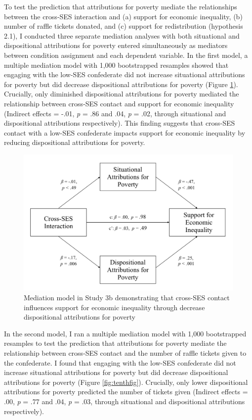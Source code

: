 \documentclass{sfuthesis}
\begin{document}
To test the prediction that attributions for poverty mediate the relationships between the cross-SES interaction and (a) support for economic inequality, (b) number of raffle tickets donated, and (c) support for redistribution (hypothesis 2.1), I conducted three separate mediation analyses with both situational and dispositional attributions for poverty entered simultaneously as mediators between condition assignment and each dependent variable. In the first model, a multiple mediation model with 1,000 bootstrapped resamples showed that engaging with the low-SES confederate did not increase situational attributions for poverty but did decrease dispositional attributions for poverty (Figure \ref{fig:ninthfig}). Crucially, only diminished dispositional attributions for poverty mediated the relationship between cross-SES contact and support for economic inequality (Indirect effects = -.01, \textit{p} = .86 and .04, \textit{p} = .02, through situational and dispositional attributions respectively). This finding suggests that cross-SES contact with a low-SES confederate impacts support for economic inequality by reducing dispositional attributions for poverty. 

\begin{figure}
  \begin{center}
    \includegraphics[scale=.75]{Fig4-3.png}
    \caption{Mediation model in Study 3b demonstrating that cross-SES contact influences support for economic inequality through decrease dispositional attributions for poverty}
    \label{fig:ninthfig}
  \end{center}
\end{figure}

In the second model, I ran a multiple mediation model with 1,000 bootstrapped resamples to test the prediction that attributions for poverty mediate the relationship between cross-SES contact and the number of raffle tickets given to the confederate. I found that engaging with the low-SES confederate did not increase situational attributions for poverty but did decrease dispositional attributions for poverty (Figure \ref{fig:tenthfig}). Crucially, only lower dispositional attributions for poverty predicted the number of tickets given (Indirect effects = .00, \textit{p} = .77 and .04, \textit{p} = .03, through situational and dispositional attributions respectively). 
\end{document}
